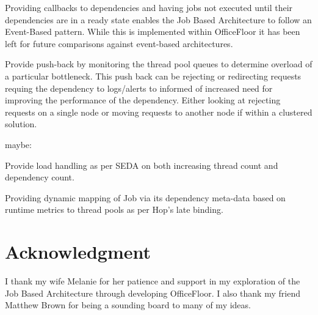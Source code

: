 \documentclass[conference]{ieee/IEEEtran}
\begin{document}
Providing callbacks to dependencies and having jobs not executed until their
dependencies are in a ready state enables the Job Based Architecture to follow
an Event-Based pattern.  While this is implemented within OfficeFloor it has
been left for future comparisons against event-based architectures.

Provide push-back by monitoring the thread pool queues to determine overload of
a particular bottleneck.  This push back can be rejecting or redirecting
requests requing the dependency to logs/alerts to informed of increased need
for improving the performance of the dependency.  Either looking at rejecting
requests on a single node or moving requests to another node if within a
clustered solution.

maybe:

Provide load handling as per SEDA on both increasing thread count and
dependency count.

Providing dynamic mapping of Job via its dependency meta-data based on runtime
metrics to thread pools as per Hop's late binding.






\section*{Acknowledgment} I thank my wife Melanie for her patience and support
in my exploration of the Job Based Architecture through developing OfficeFloor. 
I also thank my friend Matthew Brown for being a sounding board to many of my
ideas.











\end{document}
